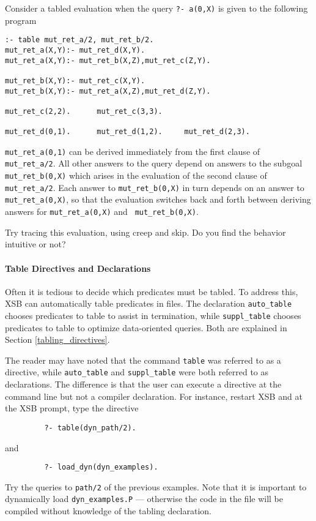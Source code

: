 \begin{exercise} \label{ex:scc}

Consider a tabled evaluation when the query {\tt ?- a(0,X)} is given
to the following program
\begin{verbatim}
:- table mut_ret_a/2, mut_ret_b/2.
mut_ret_a(X,Y):- mut_ret_d(X,Y).
mut_ret_a(X,Y):- mut_ret_b(X,Z),mut_ret_c(Z,Y).

mut_ret_b(X,Y):- mut_ret_c(X,Y).
mut_ret_b(X,Y):- mut_ret_a(X,Z),mut_ret_d(Z,Y).

mut_ret_c(2,2).      mut_ret_c(3,3).

mut_ret_d(0,1).	     mut_ret_d(1,2).     mut_ret_d(2,3).
\end{verbatim}
{\tt mut\_ret\_a(0,1)} can be derived immediately from the first
clause of {\tt mut\_ret\_a/2}.  All other answers to the query depend
on answers to the subgoal {\tt mut\_ret\_b(0,X)} which arises in the
evaluation of the second clause of {\tt mut\_ret\_a/2}.  Each answer
to {\tt mut\_ret\_b(0,X)} in turn depends on an answer to {\tt
mut\_ret\_a(0,X)}, so that the evaluation switches back and forth
between deriving answers for {\tt mut\_ret\_a(0,X)} and {\tt
mut\_ret\_b(0,X)}.

Try tracing this evaluation, using creep and skip.  Do you find the
behavior intuitive or not?
\end{exercise}

\paragraph*{Table Directives and Declarations}
Often it is tedious to decide which predicates must be tabled.  To
address this, XSB can automatically table predicates in files.  The
declaration {\tt auto\_table} chooses predicates to table to assist in
termination, while {\tt suppl\_table} chooses predicates to table to
optimize data-oriented queries.  Both are explained in Section
\ref{tabling_directives}.

\begin{exercise}
The reader may have noted that the command {\tt table} was referred to
as a directive, while {\tt auto\_table} and {\tt suppl\_table} were
both referred to as declarations.  The difference is that the user can
execute a directive at the command line but not a compiler declaration.
For instance, restart XSB and at the XSB prompt, type the directive
\begin{verbatim}
         ?- table(dyn_path/2).
\end{verbatim}
and 
\begin{verbatim}
         ?- load_dyn(dyn_examples).
\end{verbatim}
Try the queries to {\tt path/2} of the previous examples.  Note that
it is important to dynamically load {\tt dyn\_examples.P} ---
otherwise the code in the file will be compiled without knowledge of
the tabling declaration.
\end{exercise}

